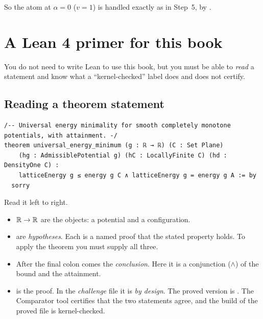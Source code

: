 So the atom at $\alpha=0$ ($v=1$) is handled exactly as in Step~5, by .

\section{A Lean 4 primer for this book}
\label{sec:lean}

You do not need to write Lean to use this book, but you must be able to \emph{read} a statement and know what a
``kernel-checked'' label does and does not certify.

\subsection{Reading a theorem statement}

\begin{leanbox}
\begin{lstlisting}[language=Lean]
/-- Universal energy minimality for smooth completely monotone potentials, with attainment. -/
theorem universal_energy_minimum (g : ℝ → ℝ) (C : Set Plane)
    (hg : AdmissiblePotential g) (hC : LocallyFinite C) (hd : DensityOne C) :
    latticeEnergy g ≤ energy g C ∧ latticeEnergy g = energy g A := by
  sorry
\end{lstlisting}
\end{leanbox}

Read it left to right.
\begin{itemize}
\item {} $\mathbb{R}\to\mathbb{R}$ are the objects: a potential and a configuration.
\item {} are \emph{hypotheses}. Each is a named proof that the stated property holds.
To apply the theorem you must supply all three.
\item After the final colon comes the \emph{conclusion}. Here it is a conjunction ($\wedge$) of the bound and the
attainment.
\item {} is the proof. In the \emph{challenge} file it is  \emph{by design}. The proved version
is . The Comparator tool certifies that the two statements agree, and
the build of the proved file is kernel-checked.
\end{itemize}

